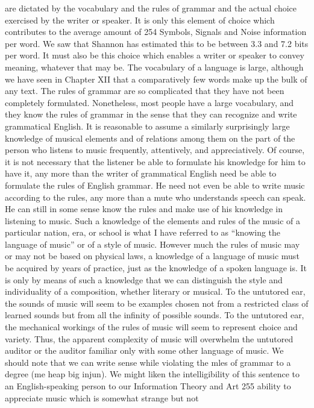 {{{{{{{{{{{{are dictated by the vocabulary and the rules of grammar and the
actual choice exercised by the writer or speaker. It is only this
element of choice which contributes to the average amount of
254
Symbols, Signals and Noise
information per word. We saw that Shannon has estimated this to
be between 3.3 and 7.2 bits per word. It must also be this choice
which enables a writer or speaker to convey meaning, whatever
that may be.
The vocabulary of a language is large, although we have seen
in Chapter XII that a comparatively few words make up the bulk
of any text. The rules of grammar are so complicated that they
have not been completely formulated. Nonetheless, most people
have a large vocabulary, and they know the rules of grammar in
the sense that they can recognize and write grammatical English.
It is reasonable to assume a similarly surprisingly large knowledge
of musical elements and of relations among them on the part
of the person who listens to music frequently, attentively, and
appreciatively. Of course, it is not necessary that the listener be
able to formulate his knowledge for him to have it, any more than
the writer of grammatical English need be able to formulate the
rules of English grammar. He need not even be able to write
music according to the rules, any more than a mute who understands
speech can speak. He can still in some sense know the rules
and make use of his knowledge in listening to music.
Such a knowledge of the elements and rules of the music of a
particular nation, era, or school is what I have referred to as
“knowing the language of music” or of a style of music. However
much the rules of music may or may not be based on physical laws,
a knowledge of a language of music must be acquired by years of
practice, just as the knowledge of a spoken language is. It is only
by means of such a knowledge that we can distinguish the style
and individuality of a composition, whether literary or musical.
To the untutored ear, the sounds of music will seem to be examples
chosen not from a restricted class of learned sounds but from all
the infinity of possible sounds. To the untutored ear, the mechanical
workings of the rules of music will seem to represent choice
and variety. Thus, the apparent complexity of music will overwhelm
the untutored auditor or the auditor familiar only with
some other language of music.
We should note that we can write sense while violating the mles
of grammar to a degree (me heap big injun). We might liken the
intelligibility of this sentence to an English-speaking person to our
Information Theory and Art
255
ability to appreciate music which is somewhat strange but not
}}}}}}}}}}}}
